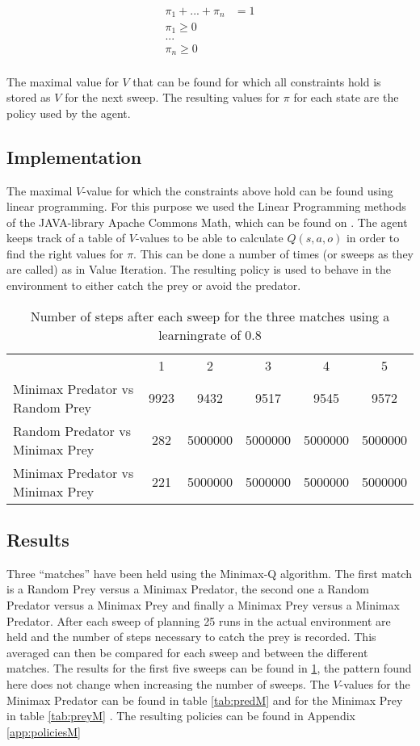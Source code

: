 \begin{align*}
\pi_1 + ... + \pi_n &= 1\\
\pi_1 \geq 0\\
...\\
\pi_n  \geq 0\\
\end{align*}

The maximal value for $V$ that can be found for which all constraints hold is stored as $V$ for the next sweep. The resulting values for $\pi$ for each state are the policy used by the agent.

\subsection{Implementation}
The maximal $V$-value for which the constraints above hold can be found using linear programming. For this purpose we used the Linear Programming methods of the JAVA-library Apache Commons Math, which can be found on \cite{commonsmath}. The agent keeps track of a table of $V$-values to be able to calculate $Q(s,a,o)$ in order to find the right values for $\pi$. This can be done a number of times (or sweeps as they are called) as in Value Iteration. The resulting policy is used to behave in the environment to either catch the prey or avoid the predator.

\begin{table}[htb]
\centering
\begin{tabular}{lccccc}
&1&2&3&4&5\\
Minimax Predator vs Random Prey & 9923 & 9432&9517&9545&9572\\
Random Predator vs Minimax Prey & 282& 5000000& 5000000& 5000000& 5000000\\
Minimax Predator vs Minimax Prey & 221& 5000000& 5000000& 5000000& 5000000\\
\end{tabular}
\caption{Number of steps after each sweep for the three matches using a learningrate of 0.8}
\label{tab:minimaxTable}
\end{table}

\FloatBarrier

\subsection{Results}
Three ``matches'' have been held using the Minimax-Q algorithm. The first match is a Random Prey versus a Minimax Predator, the second one a Random Predator versus a Minimax Prey and finally a Minimax Prey versus a Minimax Predator. After each sweep of planning 25 runs in the actual environment are held and the number of steps necessary to catch the prey is recorded. This averaged can then be compared for each sweep and between the different matches. The results for the first five sweeps can be found in \ref{tab:minimaxTable}, the pattern found here does not change when increasing the number of sweeps. The $V$-values for the Minimax Predator can be found in table \ref{tab:predM} and for the Minimax Prey in table \ref{tab:preyM} .  The resulting policies can be found in Appendix \ref{app:policiesM} 

